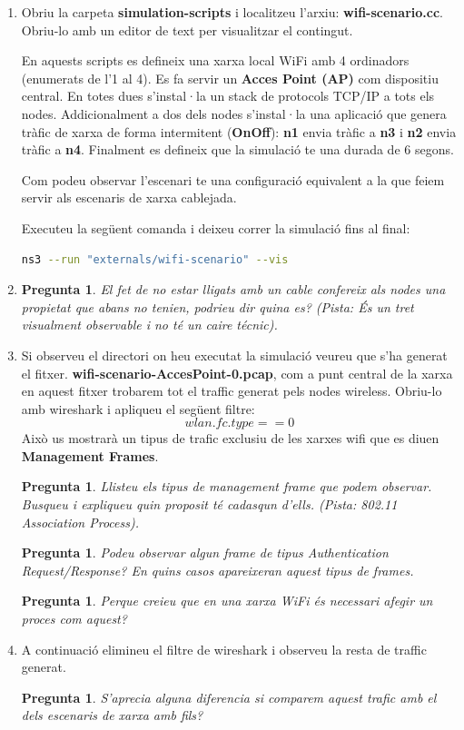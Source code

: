 \documentclass[12pt,a4paper]{article}
\newcounter{exercises}
\newtheorem{exer}[exercises]{Pregunta}
\begin{document}
\begin{enumerate}
\item Obriu la carpeta \textbf{simulation-scripts} i localitzeu l'arxiu: \textbf{wifi-scenario.cc}. Obriu-lo amb un editor de text per visualitzar el contingut.

En aquests scripts es defineix una xarxa local WiFi amb 4 ordinadors (enumerats de l'1 al 4). 
Es fa servir un \textbf{Acces Point (AP)} com dispositiu central. En totes dues s'instal·la un stack de protocols TCP/IP a tots els nodes. 
Addicionalment a dos dels nodes s'instal·la una aplicació que genera tràfic de xarxa de forma intermitent (\textbf{OnOff}): 
\textbf{n1} envia tràfic a \textbf{n3} i \textbf{n2} envia tràfic a \textbf{n4}. 
Finalment es defineix que la simulació te una durada de 6 segons.

Com podeu observar l'escenari te una configuració equivalent a la que feiem servir als escenaris de xarxa cablejada.

Executeu la següent comanda i deixeu correr la simulació fins al final:
\begin{lstlisting}[language=bash]
   ns3 --run "externals/wifi-scenario" --vis
\end{lstlisting}

 \item \begin{exer} El fet de no estar lligats amb un cable confereix als nodes una propietat que abans no tenien, podrieu dir quina es? 
 (Pista: És un tret visualment observable i no té un caire técnic).  \end{exer}
 
\item Si observeu el directori on heu executat la simulació veureu que s'ha generat el fitxer. \textbf{wifi-scenario-AccesPoint-0.pcap}, com a punt
central de la xarxa en aquest fitxer trobarem tot el traffic generat pels nodes wireless. Obriu-lo amb wireshark i apliqueu el següent filtre:
$$ wlan.fc.type == 0 $$ 
Això us mostrarà un tipus de trafic exclusiu de les xarxes wifi que es diuen \textbf{Management Frames}.
 \begin{exer} Llisteu els tipus de management frame que podem observar. Busqueu i expliqueu quin proposit té cadasqun d'ells. (Pista: 802.11 Association Process). \end{exer}
 \begin{exer} Podeu observar algun frame de tipus Authentication Request/Response? En quins casos apareixeran aquest tipus de frames.\end{exer}
 \begin{exer} Perque creieu que en una xarxa WiFi és necessari afegir un proces com aquest? \end{exer}
\item A continuació elimineu el filtre de wireshark i observeu la resta de traffic generat.
 \begin{exer} S'aprecia alguna diferencia si comparem aquest trafic amb el dels escenaris de xarxa amb fils? \end{exer}

\end{enumerate}
\end{document}
